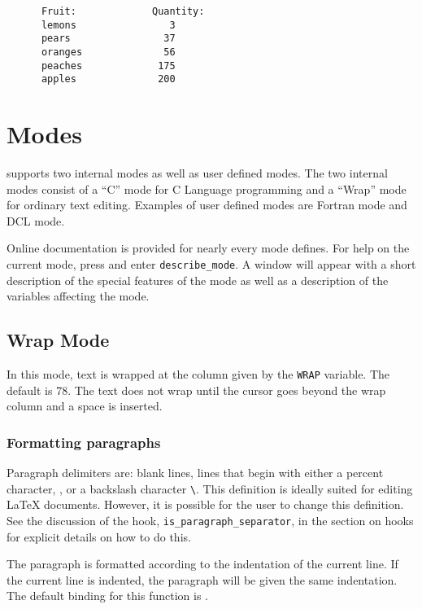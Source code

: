 \begin{verbatim}
      Fruit:             Quantity:
      lemons                3
      pears                37
      oranges              56
      peaches             175
      apples              200
\end{verbatim}

\section{Modes}

  \jed{} supports two internal modes as well as user defined modes.  The two
  internal modes consist of a ``C'' mode for C Language programming and a
  ``Wrap'' mode for ordinary text editing.  Examples of user defined modes
  are Fortran mode and DCL mode.

  Online documentation is provided for nearly every mode \jed{} defines.
  For help on the current mode, press  and enter
  \verb|describe_mode|.  A window will appear with a short description of the
  special features of the mode as well as a description of the variables
  affecting the mode.

\subsection{Wrap Mode}

  In this mode, text is wrapped at the column given by the \verb|WRAP|
  variable. The default is 78.  The text does not wrap until the cursor goes
  beyond the wrap column and a space is inserted.

\subsubsection{Formatting paragraphs}

  Paragraph delimiters are: blank lines, lines that begin with either a
  percent character, \var{\%}, or a backslash character \verb|\|.  This
  definition is ideally suited for editing \LaTeX{} documents. However, it
  is possible for the user to change this definition.  See the discussion of
  the hook, \verb|is_paragraph_separator|, in the section on hooks for
  explicit details on how to do this.

  The paragraph is formatted according to the indentation of the current
  line. If the current line is indented, the paragraph will be given the
  same indentation.  The default binding for this function is .

